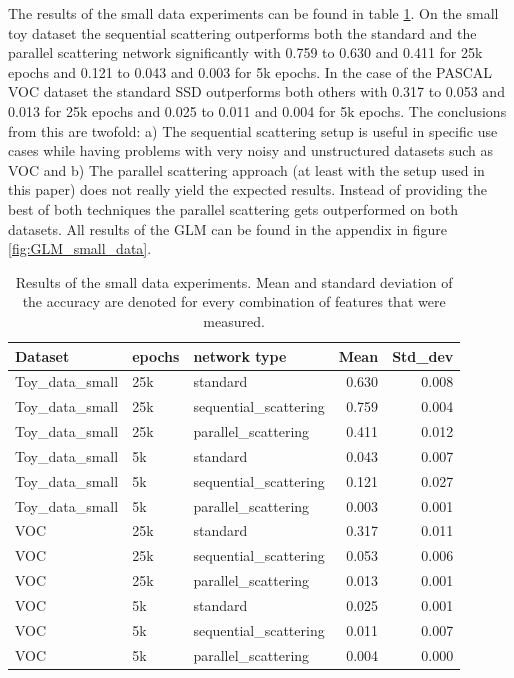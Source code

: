 The results of the small data experiments can be found in table \ref{table:small_data_experiments}. On the small toy dataset the sequential scattering outperforms both the standard and the parallel scattering network significantly with 0.759 to 0.630 and 0.411 for 25k epochs and 0.121 to 0.043 and 0.003 for 5k epochs. In the case of the PASCAL VOC dataset the standard SSD outperforms both others with 0.317 to 0.053 and 0.013 for 25k epochs and 0.025 to 0.011 and 0.004 for 5k epochs. The conclusions from this are twofold: a) The sequential scattering setup is useful in specific use cases while having problems with very noisy and unstructured datasets such as VOC and b) The parallel scattering approach (at least with the setup used in this paper) does not really yield the expected results. Instead of providing the best of both techniques the parallel scattering gets outperformed on both datasets. All results of the GLM can be found in the appendix in figure \ref{fig:GLM_small_data}. 


\begin{table}[!htb]
	\centering
	\caption{Results of the small data experiments. Mean and standard deviation of the accuracy are denoted for every combination of features that were measured.}
	\begin{tabular}{lllrr}
		\toprule
		Dataset & epochs &           network type &   Mean &  Std\_dev \\
		\midrule
		Toy\_data\_small &    25k &               standard &  0.630 &    0.008 \\
		Toy\_data\_small &    25k &  sequential\_scattering &  0.759 &    0.004 \\
		Toy\_data\_small &    25k &    parallel\_scattering &  0.411 &    0.012 \\
		Toy\_data\_small &     5k &               standard &  0.043 &    0.007 \\
		Toy\_data\_small &     5k &  sequential\_scattering &  0.121 &    0.027 \\
		Toy\_data\_small &     5k &    parallel\_scattering &  0.003 &    0.001 \\
		\hdashline
		VOC &    25k &               standard &  0.317 &    0.011 \\
		VOC &    25k &  sequential\_scattering &  0.053 &    0.006 \\
		VOC &    25k &    parallel\_scattering &  0.013 &    0.001 \\
		VOC &     5k &               standard &  0.025 &    0.001 \\
		VOC &     5k &  sequential\_scattering &  0.011 &    0.007 \\
		VOC &     5k &    parallel\_scattering &  0.004 &    0.000 \\
		\bottomrule
	\end{tabular}
	\label{table:small_data_experiments}
\end{table}

